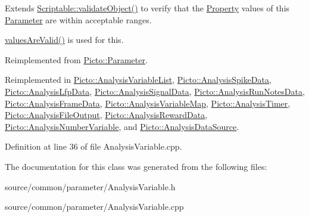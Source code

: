Extends \hyperlink{class_picto_1_1_scriptable_ab6e2944c43a3b5d418bf7b251594386d}{Scriptable\-::validate\-Object()} to verify that the \hyperlink{class_picto_1_1_property}{Property} values of this \hyperlink{class_picto_1_1_parameter}{Parameter} are within acceptable ranges. 

\hyperlink{class_picto_1_1_parameter_a3443808da4c3edf26f2c3c3772d95b10}{values\-Are\-Valid()} is used for this. 

Reimplemented from \hyperlink{class_picto_1_1_parameter_a94c0e4191ffcc0bd642b647d24557082}{Picto\-::\-Parameter}.



Reimplemented in \hyperlink{class_picto_1_1_analysis_variable_list_a5c16695870b3749708991034bc70990f}{Picto\-::\-Analysis\-Variable\-List}, \hyperlink{class_picto_1_1_analysis_spike_data_a3e7553a7a5af76724b70500418e1fe25}{Picto\-::\-Analysis\-Spike\-Data}, \hyperlink{class_picto_1_1_analysis_lfp_data_ae53fa1010780d301a104e613f93dda1a}{Picto\-::\-Analysis\-Lfp\-Data}, \hyperlink{class_picto_1_1_analysis_signal_data_a1e2a5e3c64e9b456e5074baec23e0cf6}{Picto\-::\-Analysis\-Signal\-Data}, \hyperlink{class_picto_1_1_analysis_run_notes_data_ae58942e718660c9caeb73d2dab934540}{Picto\-::\-Analysis\-Run\-Notes\-Data}, \hyperlink{class_picto_1_1_analysis_frame_data_a935dac68ae9c34e8faddcfabff4ff4be}{Picto\-::\-Analysis\-Frame\-Data}, \hyperlink{class_picto_1_1_analysis_variable_map_aa3e515949e9225ac6655095b981bb910}{Picto\-::\-Analysis\-Variable\-Map}, \hyperlink{class_picto_1_1_analysis_timer_ac3e36dbc727da6f3aa6304b4d1878e3d}{Picto\-::\-Analysis\-Timer}, \hyperlink{class_picto_1_1_analysis_file_output_a5a892bff91012d5818e0cfcfae485242}{Picto\-::\-Analysis\-File\-Output}, \hyperlink{class_picto_1_1_analysis_reward_data_a04595898ba52980c6f48755178c546ee}{Picto\-::\-Analysis\-Reward\-Data}, \hyperlink{class_picto_1_1_analysis_number_variable_a8bd41a1ccf35063cc5cef779ee3197cc}{Picto\-::\-Analysis\-Number\-Variable}, and \hyperlink{class_picto_1_1_analysis_data_source_a8d43777d1a7d1b1467c9df205d118bb3}{Picto\-::\-Analysis\-Data\-Source}.



Definition at line 36 of file Analysis\-Variable.\-cpp.



The documentation for this class was generated from the following files\-:\begin{DoxyCompactItemize}
\item 
source/common/parameter/Analysis\-Variable.\-h\item 
source/common/parameter/Analysis\-Variable.\-cpp\end{DoxyCompactItemize}
